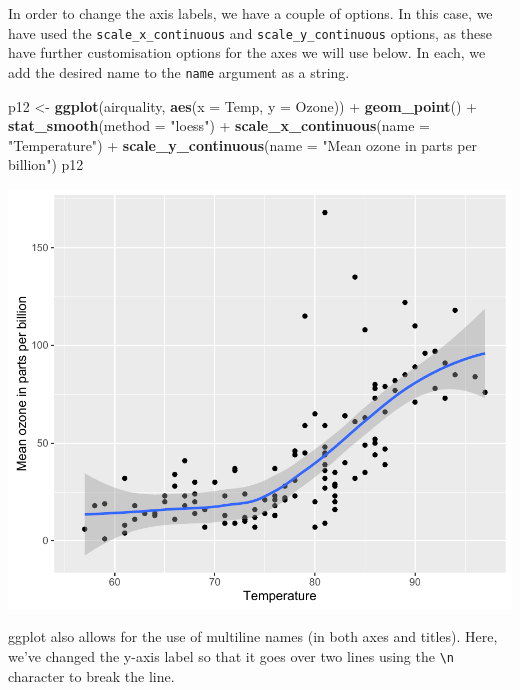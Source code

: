 \documentclass[]{article}
\newenvironment{Shaded}{\begin{snugshade}}{\end{snugshade}}
\newcommand{\KeywordTok}[1]{\textcolor[rgb]{0.13,0.29,0.53}{\textbf{{#1}}}}
\newcommand{\DataTypeTok}[1]{\textcolor[rgb]{0.13,0.29,0.53}{{#1}}}
\newcommand{\StringTok}[1]{\textcolor[rgb]{0.31,0.60,0.02}{{#1}}}
\newcommand{\NormalTok}[1]{{#1}}
\begin{document}
In order to change the axis labels, we have a couple of options. In this
case, we have used the \texttt{scale\_x\_continuous} and
\texttt{scale\_y\_continuous} options, as these have further
customisation options for the axes we will use below. In each, we add
the desired name to the \texttt{name} argument as a string.

\begin{Shaded}
\begin{Highlighting}[]
\NormalTok{p12 <-}\StringTok{ }\KeywordTok{ggplot}\NormalTok{(airquality, }\KeywordTok{aes}\NormalTok{(}\DataTypeTok{x =} \NormalTok{Temp, }\DataTypeTok{y =} \NormalTok{Ozone)) +}\StringTok{ }
\StringTok{  }\KeywordTok{geom_point}\NormalTok{() +}\StringTok{ }
\StringTok{  }\KeywordTok{stat_smooth}\NormalTok{(}\DataTypeTok{method =} \StringTok{"loess"}\NormalTok{) +}
\StringTok{  }\KeywordTok{scale_x_continuous}\NormalTok{(}\DataTypeTok{name =} \StringTok{"Temperature"}\NormalTok{) +}
\StringTok{  }\KeywordTok{scale_y_continuous}\NormalTok{(}\DataTypeTok{name =} \StringTok{"Mean ozone in parts per billion"}\NormalTok{)}
\NormalTok{p12}
\end{Highlighting}
\end{Shaded}

\begin{center}\includegraphics{12_Lowess_Plots_pdf/lowess_5-1} \end{center}

ggplot also allows for the use of multiline names (in both axes and
titles). Here, we've changed the y-axis label so that it goes over two
lines using the \texttt{\textbackslash{}n} character to break the line.
\end{document}
